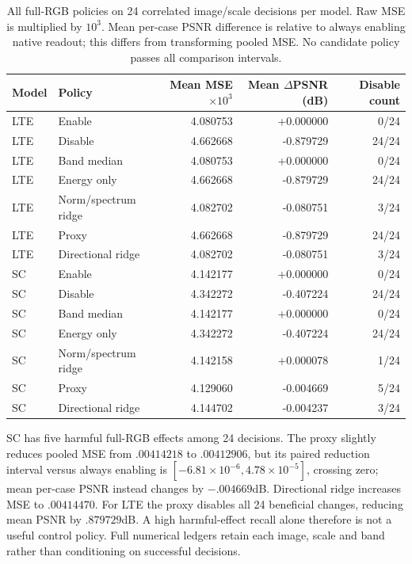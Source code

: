 \begin{table}[t]\centering\small
\caption{All full-RGB policies on 24 correlated image/scale decisions per model. Raw MSE is multiplied by $10^3$. Mean per-case PSNR difference is relative to always enabling native readout; this differs from transforming pooled MSE. No candidate policy passes all comparison intervals.}\label{tab:negative-policy}
\begin{tabular}{llrrr}\toprule
Model & Policy & Mean MSE $\times10^3$ & Mean $\Delta$PSNR (dB) & Disable count\\\midrule
LTE & Enable & 4.080753 & +0.000000 & 0/24 \\
LTE & Disable & 4.662668 & -0.879729 & 24/24 \\
LTE & Band median & 4.080753 & +0.000000 & 0/24 \\
LTE & Energy only & 4.662668 & -0.879729 & 24/24 \\
LTE & Norm/spectrum ridge & 4.082702 & -0.080751 & 3/24 \\
LTE & Proxy & 4.662668 & -0.879729 & 24/24 \\
LTE & Directional ridge & 4.082702 & -0.080751 & 3/24 \\
SC & Enable & 4.142177 & +0.000000 & 0/24 \\
SC & Disable & 4.342272 & -0.407224 & 24/24 \\
SC & Band median & 4.142177 & +0.000000 & 0/24 \\
SC & Energy only & 4.342272 & -0.407224 & 24/24 \\
SC & Norm/spectrum ridge & 4.142158 & +0.000078 & 1/24 \\
SC & Proxy & 4.129060 & -0.004669 & 5/24 \\
SC & Directional ridge & 4.144702 & -0.004237 & 3/24 \\
\bottomrule\end{tabular}\end{table}

SC has five harmful full-RGB effects among 24 decisions. The proxy slightly reduces pooled MSE from $.00414218$ to $.00412906$, but its paired reduction interval versus always enabling is $[-6.81\times10^{-6},4.78\times10^{-5}]$, crossing zero; mean per-case PSNR instead changes by $-.004669$dB. Directional ridge increases MSE to $.00414470$. For LTE the proxy disables all 24 beneficial changes, reducing mean PSNR by $.879729$dB. A high harmful-effect recall alone therefore is not a useful control policy. Full numerical ledgers retain each image, scale and band rather than conditioning on successful decisions.


